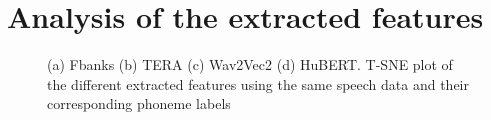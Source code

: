 \section{Analysis of the extracted features}
\begin{figure}
  \begin{center}
  \centering
  \caption{(a) Fbanks (b) TERA (c) Wav2Vec2 (d) HuBERT. T-SNE plot of the different extracted features using the same speech data and their corresponding phoneme labels}
  \label{fig:tsne_SSL}  
\end{center}
\end{figure}
